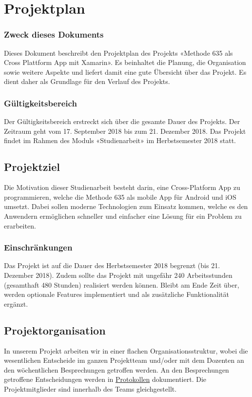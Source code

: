 \section{Projektplan}

\subsubsection*{Zweck dieses Dokuments}
Dieses Dokument beschreibt den Projektplan des Projekts «Methode 635 als Cross Plattform App mit Xamarin». Es beinhaltet die Planung, die Organisation sowie weitere Aspekte und liefert damit eine gute Übersicht über das Projekt. Es dient daher als Grundlage für den Verlauf des Projekts.

\subsubsection*{Gültigkeitsbereich}
Der Gültigkeitsbereich erstreckt sich über die gesamte Dauer des Projekts. Der Zeitraum geht vom 17. September 2018 bis zum 21. Dezember 2018. Das Projekt findet im Rahmen des Moduls «Studienarbeit» im Herbstsemester 2018 statt.

\subsection{Projektziel}
Die Motivation dieser Studienarbeit besteht darin, eine Cross-Platform App zu programmieren, welche die Methode 635 \cite{methode-635} als mobile App für Android und iOS umsetzt. Dabei sollen moderne Technologien zum Einsatz kommen, welche es den Anwendern ermöglichen schneller und einfacher eine Lösung für ein Problem zu erarbeiten.

\subsubsection*{Einschränkungen}
Das Projekt ist auf die Dauer des Herbstsemester 2018 begrenzt (bis 21. Dezember 2018). Zudem sollte das Projekt mit ungefähr 240 Arbeitsstunden (gesamthaft 480 Stunden) realisiert werden können. Bleibt am Ende Zeit über, werden optionale Features implementiert und als zusätzliche Funktionalität ergänzt.

\subsection{Projektorganisation}
In unserem Projekt arbeiten wir in einer flachen Organisationsstruktur, wobei die wesentlichen Entscheide im ganzen Projektteam und/oder mit dem Dozenten an den wöchentlichen Besprechungen getroffen werden. An den Besprechungen getroffene Entscheidungen werden in \href{https://github.com/BrainingOutOfBox/Doc/wiki} {Protokollen} dokumentiert. Die Projektmitglieder sind innerhalb des Teams gleichgestellt.

